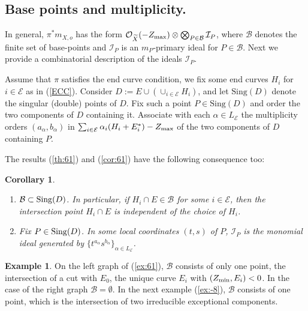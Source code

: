 \documentclass[10pt,a4paper]{amsart}
\numberwithin{equation}{section}
\numberwithin{equation}{subsection}
\theoremstyle{plain}
\newtheorem{corollary}[equation]{Corollary}
\theoremstyle{definition}
\newtheorem{example}[equation]{Example}
\begin{document}
\subsection{Base points and multiplicity.} In general,  $\pi^*m_{X,o}$
has the form ${\mathcal{O}}_{\widetilde{X}}(-Z_{{\rm max}})\otimes
\bigotimes_{P\in{\mathcal{B}}}{\mathcal{I}}_P$, where ${\mathcal{B}}$ denotes the finite set of
base-points and ${\mathcal{I}}_P$ is an $m_P$-primary ideal for $P\in {\mathcal{B}}$.
Next we provide a combinatorial description of the ideals ${\mathcal{I}}_P$.

Assume that $\pi$ satisfies the end curve condition, we fix some
end curves $H_i$ for $i\in{\mathcal{E}}$ as in (\ref{ECC}). Consider
$D:=E\cup(\cup_{i\in{\mathcal{E}}}H_i)$, and let $\mathrm{Sing}(D)$ denote
the singular (double) points of $D$. Fix such a point
$P\in\mathrm{Sing}(D)$ and order the two components of $D$
containing it. Associate with each $\alpha\in L_{\mathcal{E}}$ the
multiplicity orders $(a_\alpha,b_\alpha)$ in $\sum_{i\in
{\mathcal{E}}}\alpha_i(H_i+E_i^*)-Z_{{\rm max}}$  of the two components of
$D$ containing $P$.

The results (\ref{th:61}) and (\ref{cor:61}) have the following
consequence too:
\begin{corollary}\label{lem:610}
\begin{enumerate}
\item\label{lem:61}
${\mathcal{B}}\subset {\rm Sing}(D)$.  In particular, if $H_i\cap E\in {\mathcal{B}}$
for some $i\in {\mathcal{E}}$, then the intersection point $H_i\cap E$ is
independent of the choice of $H_i$.
\item\label{lem:62} Fix $P\in{\rm Sing}(D)$.
In some local coordinates $(t,s)$ of $P$, ${\mathcal{I}}_P$ is the monomial
ideal generated by $\{t^{a_\alpha}s^{b_\alpha}\}_{\alpha\in
L_{\mathcal{E}}}$.
\end{enumerate}
\end{corollary}

\begin{example}
On the left graph of (\ref{ex:61}), ${\mathcal{B}}$ consists of only one
point, the intersection of a cut with $E_0$,  the unique curve
$E_i$ with $(Z_{{\rm min}},E_i)<0$. In the case of the right graph
${\mathcal{B}}=\emptyset$. In the next example (\ref{ex:-8}), ${\mathcal{B}}$ consists
of one point, which is the intersection of two irreducible
exceptional components.
\end{example}
\end{document}

